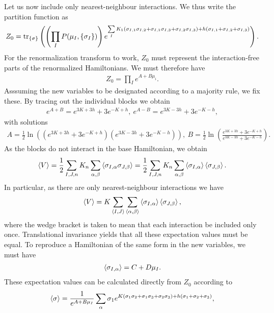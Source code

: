 Let us now include only nearest-neighbour interactions. We thus write the partition function as
\begin{align*}
	Z_{0} = \tr\limits_{\{\sigma\}}\left(\left(\prod\limits_{I}P(\mu_{I}, \{\sigma_{I}\})\right)e^{\sum\limits_{I}K_{1}(\sigma_{I, 1}\sigma_{I, 2} + \sigma_{I, 1}\sigma_{I, 3} + \sigma_{I, 2}\sigma_{I, 3}) + h(\sigma_{I, 1} + \sigma_{I, 2} + \sigma_{I, 3})}\right).
\end{align*}
For the renormalization transform to work, $Z_{0}$ must represent the interaction-free parts of the renormalized Hamiltonians. We must therefore have
\begin{align*}
	Z_{0} = \prod\limits_{I}e^{A + B\mu_{i}}.
\end{align*}
Asssuming the new variables to be designated according to a majority rule, we fix these. By tracing out the individual blocks we obtain
\begin{align*}
	e^{A + B} = e^{3K + 3h} + 3e^{-K + h},\ e^{A - B} = e^{3K - 3h} + 3e^{-K - h},
\end{align*}
with solutions
\begin{align*}
	A = \frac{1}{2}\ln((e^{3K + 3h} + 3e^{-K + h})(e^{3K - 3h} + 3e^{-K - h})),\ B = \frac{1}{2}\ln(\frac{e^{3K + 3h} + 3e^{-K + h}}{e^{3K - 3h} + 3e^{-K - h}}).
\end{align*}
As the blocks do not interact in the base Hamiltonian, we obtain
\begin{align*}
	\expval{V} = \frac{1}{2}\sum\limits_{I, J, n}K_{n}\sum\limits_{\alpha, \beta}\expval{\sigma_{I, \alpha}\sigma_{J, \beta}} = \frac{1}{2}\sum\limits_{I, J, n}K_{n}\sum\limits_{\alpha, \beta}\expval{\sigma_{I, \alpha}}\expval{\sigma_{J, \beta}}.
\end{align*}
In particular, as there are only nearest-neighbour interactions we have
\begin{align*}
	\expval{V} = K\sum\limits_{\langle I, J\rangle}\sum\limits_{\langle\alpha, \beta\rangle}\expval{\sigma_{I, \alpha}}\expval{\sigma_{J, \beta}},
\end{align*}
where the wedge bracket is taken to mean that each interaction be included only once. Translational invariance yields that all these expectation values must be equal. To reproduce a Hamiltonian of the same form in the new variables, we must have
\begin{align*}
	\expval{\sigma_{I, \alpha}} = C + D\mu_{I}.
\end{align*}
These expectation values can be calculated directly from $Z_{0}$ according to
\begin{align*}
	\expval{\sigma} = \frac{1}{e^{A + B\mu_{I}}}\sum\limits_{\alpha}\sigma_{1}e^{K(\sigma_{1}\sigma_{2} + \sigma_{1}\sigma_{3} + \sigma_{2}\sigma_{3}) + h(\sigma_{1} + \sigma_{2} + \sigma_{3})},
\end{align*}
